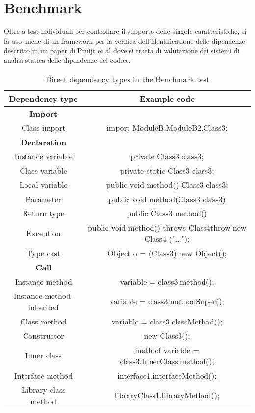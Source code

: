 \section{Benchmark}

Oltre a test individuali per controllare il supporto delle singole caratteristiche, si fa uso anche di un framework per la verifica dell'identificazione delle dipendenze descritto in un paper di Pruijt et al \cite{DBLP:journals/spe/PruijtKWB17} dove si tratta di valutazione dei sistemi di analisi statica delle dipendenze del codice.

\begin{table}
    \centering
    \caption{Direct dependency types in the Benchmark test}
    \begin{tabular}{|c c|}
        \hline
        Dependency type & Example code \\
        \hline
        \textbf{Import} &  \\
        Class import & import ModuleB.ModuleB2.Class3; \\
        \textbf{Declaration} &  \\
        Instance variable & private Class3 class3; \\
        Class variable & private static Class3 class3; \\
        Local variable & public void method() {Class3 class3; } \\
        Parameter & public void method(Class3 class3) {} \\
        Return type & public Class3 method() {} \\
        Exception & public void method() throws Class4{throw new Class4 ("..."); } \\
        Type cast & Object o = (Class3) new Object(); \\
        \textbf{Call} &  \\
        Instance method & variable = class3.method(); \\
        Instance method-inherited & variable = class3.methodSuper(); \\
        Class method & variable = class3.classMethod(); \\
        Constructor & new Class3(); \\
        Inner class & method variable = class3.InnerClass.method(); \\
        Interface method & interface1.interfaceMethod(); \\
        Library class method & libraryClass1.libraryMethod(); \\

\end{tabular}
\end{table}
